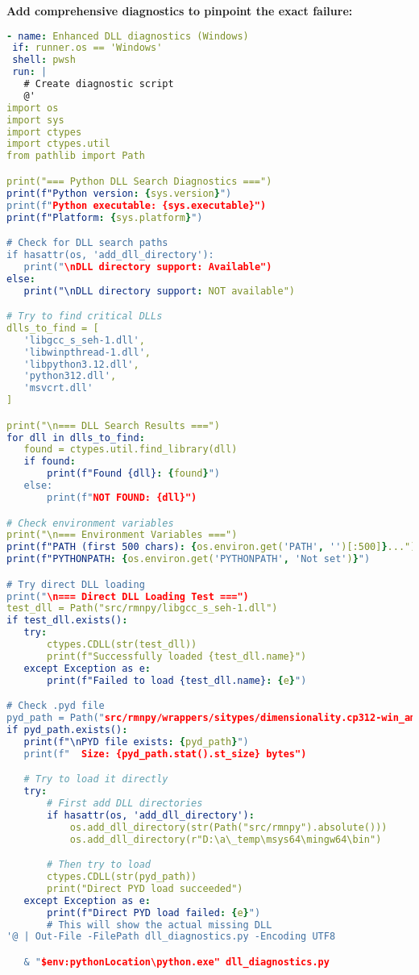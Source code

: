 \documentclass[11pt]{article}
\begin{document}
\textbf{Add comprehensive diagnostics to pinpoint the exact failure:}

\begin{lstlisting}[language=yaml]
- name: Enhanced DLL diagnostics (Windows)
 if: runner.os == 'Windows'
 shell: pwsh
 run: |
   # Create diagnostic script
   @'
import os
import sys
import ctypes
import ctypes.util
from pathlib import Path

print("=== Python DLL Search Diagnostics ===")
print(f"Python version: {sys.version}")
print(f"Python executable: {sys.executable}")
print(f"Platform: {sys.platform}")

# Check for DLL search paths
if hasattr(os, 'add_dll_directory'):
   print("\nDLL directory support: Available")
else:
   print("\nDLL directory support: NOT available")

# Try to find critical DLLs
dlls_to_find = [
   'libgcc_s_seh-1.dll',
   'libwinpthread-1.dll',
   'libpython3.12.dll',
   'python312.dll',
   'msvcrt.dll'
]

print("\n=== DLL Search Results ===")
for dll in dlls_to_find:
   found = ctypes.util.find_library(dll)
   if found:
       print(f"Found {dll}: {found}")
   else:
       print(f"NOT FOUND: {dll}")

# Check environment variables
print("\n=== Environment Variables ===")
print(f"PATH (first 500 chars): {os.environ.get('PATH', '')[:500]}...")
print(f"PYTHONPATH: {os.environ.get('PYTHONPATH', 'Not set')}")

# Try direct DLL loading
print("\n=== Direct DLL Loading Test ===")
test_dll = Path("src/rmnpy/libgcc_s_seh-1.dll")
if test_dll.exists():
   try:
       ctypes.CDLL(str(test_dll))
       print(f"Successfully loaded {test_dll.name}")
   except Exception as e:
       print(f"Failed to load {test_dll.name}: {e}")

# Check .pyd file
pyd_path = Path("src/rmnpy/wrappers/sitypes/dimensionality.cp312-win_amd64.pyd")
if pyd_path.exists():
   print(f"\nPYD file exists: {pyd_path}")
   print(f"  Size: {pyd_path.stat().st_size} bytes")

   # Try to load it directly
   try:
       # First add DLL directories
       if hasattr(os, 'add_dll_directory'):
           os.add_dll_directory(str(Path("src/rmnpy").absolute()))
           os.add_dll_directory(r"D:\a\_temp\msys64\mingw64\bin")

       # Then try to load
       ctypes.CDLL(str(pyd_path))
       print("Direct PYD load succeeded")
   except Exception as e:
       print(f"Direct PYD load failed: {e}")
       # This will show the actual missing DLL
'@ | Out-File -FilePath dll_diagnostics.py -Encoding UTF8

   & "$env:pythonLocation\python.exe" dll_diagnostics.py
\end{lstlisting}
\end{document}
